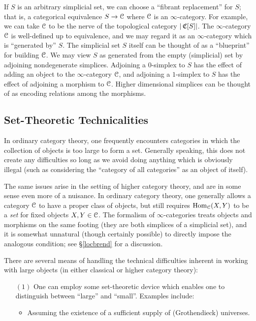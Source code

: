 \begin{Didn't Read}
If $S$ is an arbitrary simplicial set, we can
choose a ``fibrant replacement'' for $S$; that is, a categorical
equivalence $S \rightarrow \operatorname{\mathcal{C}}$ where $\operatorname{\mathcal{C}}$ is an $\infty$-category. 
For example, we can take $\operatorname{\mathcal{C}}$ to be the nerve of the topological
category $| \operatorname{\mathfrak{C}}[S] |$. 
The $\infty$-category $\operatorname{\mathcal{C}}$ is
well-defined up to equivalence, and we may
regard it as an $\infty$-category which is ``generated by'' $S$. The simplicial set $S$ itself can be thought of as a ``blueprint'' for building $\operatorname{\mathcal{C}}$. We may view $S$ as generated from the empty (simplicial) set by adjoining nondegenerate simplices. Adjoining a $0$-simplex to $S$ has the effect of adding an object to the $\infty$-category $\operatorname{\mathcal{C}}$, and adjoining a $1$-simplex to $S$ has the effect of adjoining a morphism to $\operatorname{\mathcal{C}}$. Higher dimensional simplices can be thought of as encoding relations among the morphisms.

\subsection{Set-Theoretic Technicalities}

In ordinary category theory, one frequently encounters categories in which the collection of objects
is too large to form a set. Generally speaking, this does not create
any difficulties so long as we avoid doing anything which is obviously illegal
(such as considering the ``category of all categories'' as an object of itself).

The same issues arise in the setting of higher category theory, and are
in some sense even more of a nuisance. In ordinary category
theory, one generally allows a category $\operatorname{\mathcal{C}}$ to have a proper
class of objects, but still requires $\operatorname{Hom}_{\operatorname{\mathcal{C}}}(X,Y)$ to be a
{\em set} for fixed objects $X,Y \in \operatorname{\mathcal{C}}$. The formalism of $\infty$-categories treats
objects and morphisms on the same footing (they are both simplices of a simplicial set), and it is somewhat unnatural (though certainly possible) to directly impose the analogous condition; see \S \ref{locbrend} for a discussion.

There are several means of handling the technical difficulties
inherent in working with large objects (in either classical or higher category theory):

\begin{itemize}
\item[$(1)$] One can employ some set-theoretic device which enables one
to distinguish between ``large'' and ``small''. Examples include:
\begin{itemize}
\item Assuming the existence of a sufficient supply of
(Grothendieck) universes.


\end{itemize}
\end{itemize}
\end{Didn't Read}
